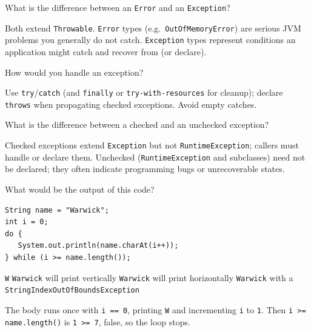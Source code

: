 


\question[4]
What is the difference between an \texttt{Error} and an \texttt{Exception}?
\begin{solutionorbox}[1.35in]
  Both extend \texttt{Throwable}. \texttt{Error} types (e.g.\ \texttt{OutOfMemoryError}) are serious JVM problems you generally do not catch. \texttt{Exception} types represent conditions an application might catch and recover from (or declare).
\end{solutionorbox}

\question[4]
How would you handle an exception?
\begin{solutionorbox}[1.35in]
  Use \texttt{try}/\texttt{catch} (and \texttt{finally} or \texttt{try-with-resources} for cleanup); declare \texttt{throws} when propagating checked exceptions. Avoid empty catches.
\end{solutionorbox}

\question[4]
What is the difference between a checked and an unchecked exception?
\begin{solutionorbox}[1.35in]
  Checked exceptions extend \texttt{Exception} but not \texttt{RuntimeException}; callers must handle or declare them. Unchecked (\texttt{RuntimeException} and subclasses) need not be declared; they often indicate programming bugs or unrecoverable states.
\end{solutionorbox}

\newpage



\question[4]
What would be the output of this code?
\begin{lstlisting}[style=java]
String name = "Warwick";
int i = 0;
do {
   System.out.println(name.charAt(i++));
} while (i >= name.length());
\end{lstlisting}
\begin{choices}
  \CorrectChoice \texttt{W}
  \choice \texttt{Warwick} will print vertically
  \choice \texttt{Warwick} will print horizontally
  \choice \texttt{Warwick} with a \texttt{StringIndexOutOfBoundsException}
\end{choices}
\begin{solution}
  The body runs once with \texttt{i == 0}, printing \texttt{W} and incrementing \texttt{i} to \texttt{1}. Then \texttt{i >= name.length()} is \texttt{1 >= 7}, false, so the loop stops.
\end{solution}

